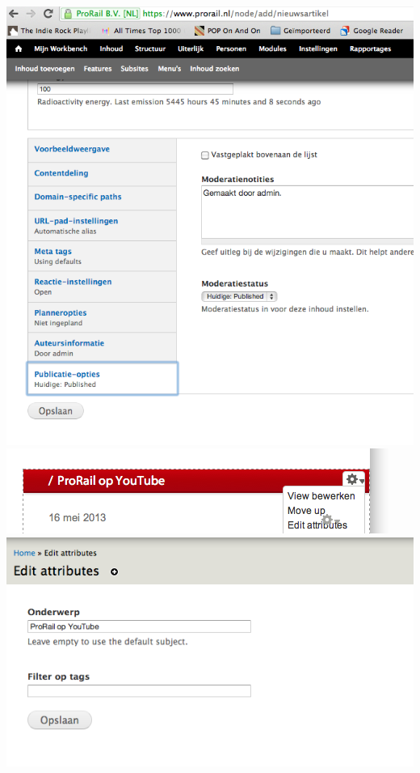 \includegraphics[width=\textwidth]{img/youtubebloksticky.png}
\includegraphics[width=\textwidth]{img/youtubeblok1.png}
\includegraphics[width=\textwidth]{img/youtubeblok2.png}
